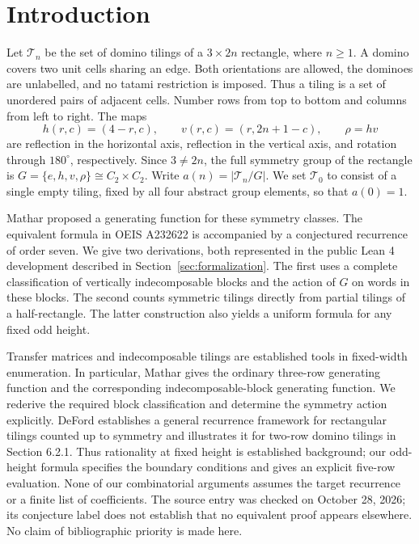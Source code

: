 \section{Introduction}\label{sec:intro}

Let $\mathcal T_n$ be the set of domino tilings of a $3\times 2n$
rectangle, where $n\ge1$. A domino covers two unit cells sharing an
edge. Both orientations are allowed, the dominoes are unlabelled,
and no tatami restriction is imposed. Thus a tiling is a set of
unordered pairs of adjacent cells.
Number rows from top to bottom and columns from left to right.
The maps
\[
 h(r,c)=(4-r,c),\qquad v(r,c)=(r,2n+1-c),\qquad \rho=hv
\]
are reflection in the horizontal axis, reflection in the vertical
axis, and rotation through $180^\circ$, respectively.
Since $3\ne2n$, the full symmetry group of the rectangle is
$G=\{e,h,v,\rho\}\cong C_2\times C_2$.
Write $a(n)=|\mathcal T_n/G|$. We set $\mathcal T_0$ to consist of a
single empty tiling, fixed by all four abstract group elements, so
that $a(0)=1$.

Mathar \cite[Table 10, Conjecture 6]{mathar2013} proposed a generating
function for these symmetry classes. The equivalent formula in
OEIS A232622 \cite{oeis} is accompanied by a conjectured recurrence
of order seven. We give two derivations, both represented in the public Lean 4 development described in Section~\ref{sec:formalization}.
The first uses a complete classification of vertically
indecomposable blocks and the action of $G$ on words in these blocks.
The second counts symmetric tilings directly from partial tilings
of a half-rectangle.
The latter construction also yields a uniform formula for any fixed
odd height.

Transfer matrices and indecomposable tilings are established tools
in fixed-width enumeration. In particular, Mathar
\cite[Sections 2.1--2.3]{mathar2014} gives the ordinary three-row
generating function and the corresponding indecomposable-block
generating function. We rederive the required block classification
and determine the symmetry action explicitly.
DeFord \cite[Theorem 6.1]{deford} establishes a general recurrence
framework for rectangular tilings counted up to symmetry and
illustrates it for two-row domino tilings in Section 6.2.1.
Thus rationality at fixed height is established background;
our odd-height formula specifies the boundary conditions and
gives an explicit five-row evaluation.
None of our
combinatorial arguments assumes the target recurrence or a finite
list of coefficients.
The source entry was checked on October 28, 2026; its conjecture
label does not establish that no equivalent proof appears elsewhere.
No claim of bibliographic priority is made here.

